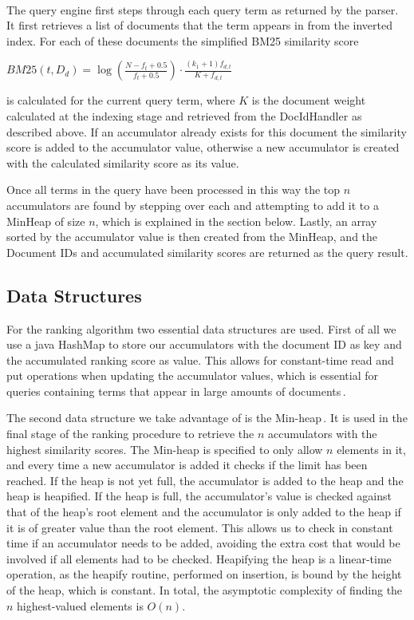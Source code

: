 \paragraph*{}
The query engine first steps through each query term as returned by the parser. It first retrieves a list of documents that the term appears in from the inverted index. For each of these documents the simplified BM25 similarity score\\
\begin{center}
$BM25(t, D_d) = \log \left( \frac{N - f_t + 0.5}{f_t + 0.5} \right) \cdot \frac{(k_1 + 1) f_{d,t}}{K + f_{d,t}}$\\
\end{center}
is calculated for the current query term, where $K$ is the document weight calculated at the indexing stage and retrieved from the DocIdHandler as described above.
If an accumulator already exists for this document the similarity score is added to the accumulator value, otherwise a new accumulator is created with the calculated similarity score as its value.

Once all terms in the query have been processed in this way the top $n$ accumulators are found by stepping over each and attempting to add it to a MinHeap of size $n$, which is explained in the section below. Lastly, an array sorted by the accumulator value is then created from the MinHeap, and the Document IDs and accumulated similarity scores are returned as the query result.

\subsection*{Data Structures}
For the ranking algorithm two essential data structures are used. First of all we use a java HashMap to store our accumulators with the document ID as key and the accumulated ranking score as value. This allows for constant-time read and put operations when updating the accumulator values, which is essential for queries containing terms that appear in large amounts of documents\,\cite{hashmap}.

The second data structure we take advantage of is the Min-heap\,\cite{wolfram13}. It is used in the final stage of the ranking procedure to retrieve the $n$ accumulators with the highest similarity scores. The Min-heap is specified to only allow $n$ elements in it, and every time a new accumulator is added it checks if the limit has been reached. If the heap is not yet full, the accumulator is added to the heap and the heap is heapified. If the heap is full, the accumulator's value is checked against that of the heap's root element and the accumulator is only added to the heap if it is of greater value than the root element. This allows us to check in constant time if an accumulator needs to be added, avoiding the extra cost that would be involved if all elements had to be checked. Heapifying the heap is a linear-time operation, as the heapify routine, performed on insertion, is bound by the height of the heap, which is constant. In total, the asymptotic complexity of finding the $n$ highest-valued elements is $O(n)$.
